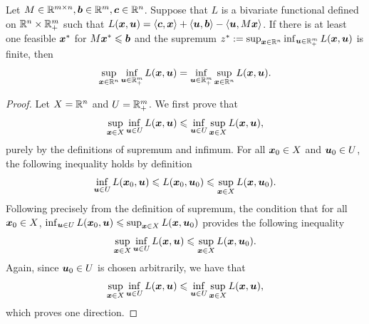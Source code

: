 \begin{theorem}\label{minimax}
Let $M\in \rr^{m\times n}, \bbb\in\rr^m, \bcc\in\rr^n$. Suppose that $L$ is a bivariate functional defined on $\rr^n\times \rr_+^{m}$ such that $L(\bmx, \bmu)  =  \inner{\bmc, \xx} +  \inner{\bmu, \bmb}-\inner{\bmu, M\bm x}$. If there is at least one feasible $\bmx\rast$ for $M\bmx\rast \leq \bmb$ and the supremum $z^* :=  \sup_{\bmx\in\rr^n} \inf_{\bmu\in\rr^m_+} L(\bm x, \bmu)$ is finite, then 
\begin{equation}\label{eqn: sup inf exchange}  \sup_{\bmx\in\rr^n} \inf_{\bmu\in\rr^m_+} L(\bm x, \bmu) =  \inf_{\bmu\in\rr^m_+} \sup_{\bmx\in\rr^n} L(\bm x, \bmu). \end{equation}
\end{theorem}
\begin{proof}
Let $X = \rr^n$ and $U =  \rr^m_+$. We first prove that \[ \sup_{\bmx\in X} \inf_{\bmu\in U} L(\bmx, \bmu) \leq \inf_{\bmu\in U} \sup_{\bmx\in X} L(\bmx, \bmu),\] purely by the definitions of supremum and infimum. For all $\bmx_0\in X$ and $\bmu_0\in U$, the following inequality holds by definition 
\[ \inf_{\bmu\in U} L(\bmx_0, \bmu) \leq L(\bmx_0, \bmu_0)\leq \sup_{\bmx\in X}L(\bmx, \bmu_0). \]
Following precisely from the definition of supremum, the condition that for all $\bmx_0\in X$, $ \inf_{\bmu\in U} L(\bmx_0, \bmu) \leq \sup_{\bmx\in X}L(\bmx, \bmu_0)$ provides the following inequality 
\[ \sup_{\bmx\in X}\inf_{\bmu\in U} L(\bmx, \bmu) \leq \sup_{\bmx\in X}L(\bmx, \bmu_0). \]
Again, since $\bmu_0\in U$ is chosen arbitrarily, we have that 
\[ \sup_{\bmx\in X}\inf_{\bmu\in U} L(\bmx, \bmu) \leq \inf_{\bmu\in U}\sup_{\bmx\in X}L(\bmx, \bmu), \]
which proves one direction. 


\end{proof}
